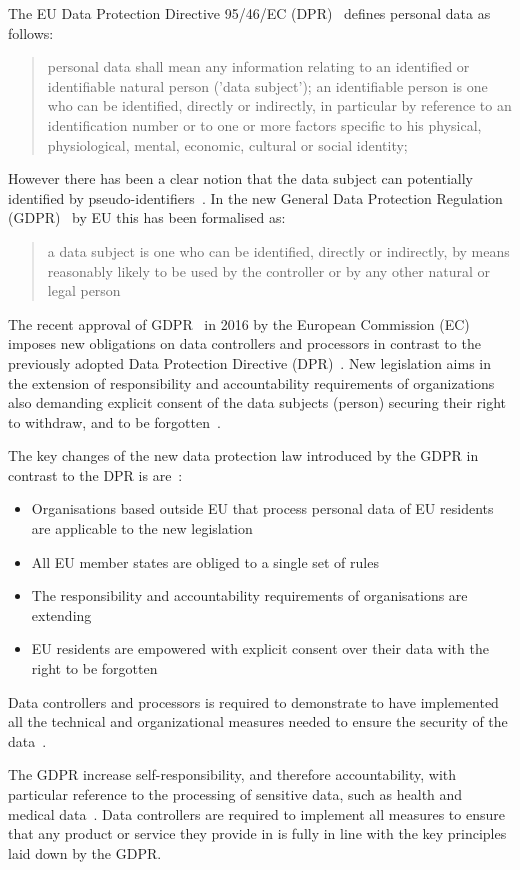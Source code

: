 The EU Data Protection Directive 95/46/EC (DPR)~\cite{eu-46ec-1995} defines personal data as follows:
\blockquote{
personal data shall mean any information relating to an identified or identifiable natural person ('data subject'); an identifiable person is one who can be identified, directly or indirectly, in particular by reference to an identification number or to one or more factors specific to his physical, physiological, mental, economic, cultural or social identity;
}
However there has been a clear notion that the data subject can potentially identified by pseudo-identifiers~\cite{pii}.
In the new General Data Protection Regulation (GDPR)~\cite{gdpr} by EU this has been formalised as:
\blockquote{
a data subject is one who can be identified, directly or indirectly, by means reasonably likely to be used by the controller or by any other natural or legal person
}

The recent approval of GDPR~\cite{gdpr} in 2016 by the European Commission (EC)
imposes new obligations on data controllers and processors in contrast to the previously adopted Data Protection Directive (DPR)~\cite{eu-46ec-1995}.
New legislation aims in the extension of responsibility and accountability requirements of organizations also demanding explicit
consent of the data subjects (person) securing their right to withdraw, and to be forgotten~\cite{DBLP:journals/corr/NeisseSF17}.

The key changes of the new data protection law introduced by the GDPR in contrast to the DPR is are~\cite{DBLP:journals/corr/NeisseSF17}:
\begin{itemize}
    \item Organisations based outside EU that process personal data of EU residents are applicable to the new legislation
    \item All EU member states are obliged to a single set of rules
    \item The responsibility and accountability requirements of organisations are extending
    \item EU residents are empowered with explicit consent over their data with the right to be forgotten
\end{itemize}

Data controllers and processors is required to demonstrate to have implemented all the technical and organizational measures needed to ensure the security of the data~\cite{mhmd}.

The GDPR increase self-responsibility, and therefore accountability, with particular reference to the processing of sensitive data, such as health and medical data~\cite{mhmd}. Data controllers are required to implement all measures to ensure that any product or service they provide in is fully in line with the key principles laid down by the GDPR.

